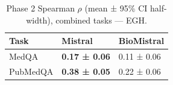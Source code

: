 \begin{table}
\caption{Phase 2 Spearman $\rho$ (mean ± 95\% CI half-width), combined tasks — EGH.}
\label{tab:phase2_spearman_all_egh_probe_oof}
\begin{tabular}{lll}
\toprule
Task & Mistral & BioMistral \\
\midrule
MedQA & \textbf{0.17 ± 0.06} & 0.11 ± 0.06 \\
PubMedQA & \textbf{0.38 ± 0.05} & 0.22 ± 0.06 \\
\bottomrule
\end{tabular}
\end{table}
